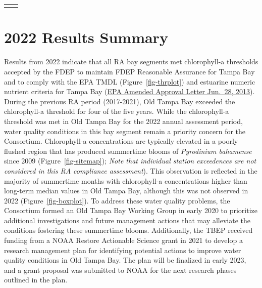 \documentclass[
  letterpaper,
  DIV=11,
  numbers=noendperiod]{scrreprt}
\begin{document}
\begin{table}[H]
\begin{longtable}[l]{|p{1.50in}|p{5.00in}}
}}\textcolor[HTML]{000000}{\fontsize{13}{13}\selectfont{reasonable}}\textcolor[HTML]{000000}{\fontsize{13}{13}\selectfont{\ }}\textcolor[HTML]{000000}{\fontsize{13}{13}\selectfont{assurance}}\textcolor[HTML]{000000}{\fontsize{13}{13}\selectfont{\ }}\textcolor[HTML]{000000}{\fontsize{13}{13}\selectfont{for}}\textcolor[HTML]{000000}{\fontsize{13}{13}\selectfont{\ }}\textcolor[HTML]{000000}{\fontsize{13}{13}\selectfont{bay}}\textcolor[HTML]{000000}{\fontsize{13}{13}\selectfont{\ }}\textcolor[HTML]{000000}{\fontsize{13}{13}\selectfont{segment}}\textcolor[HTML]{000000}{\fontsize{13}{13}\selectfont{\ }}\textcolor[HTML]{000000}{\fontsize{13}{13}\selectfont{allocations.}}} \\





\end{longtable}

\end{table}


\hypertarget{var-maxyr-results-summary}{%
\chapter{2022 Results Summary}\label{var-maxyr-results-summary}}

Results from 2022 indicate that all RA bay segments met chlorophyll-a
thresholds accepted by the FDEP to maintain FDEP Reasonable Assurance
for Tampa Bay and to comply with the EPA TMDL (Figure~\ref{fig-thrplot})
and estuarine numeric nutrient criteria for Tampa Bay
(\href{https://www.epa.gov/sites/default/files/2015-04/documents/florida-amended-determination.pdf}{EPA
Amended Approval Letter Jun.~28, 2013}). During the previous RA period
(2017-2021), Old Tampa Bay exceeded the chlorophyll-a threshold for four
of the five years. While the chlorophyll-a threshold was met in Old
Tampa Bay for the 2022 annual assessment period, water quality
conditions in this bay segment remain a priority concern for the
Consortium. Chlorophyll-a concentrations are typically elevated in a
poorly flushed region that has produced summertime blooms of
\emph{Pyrodinium bahamense} since 2009 (Figure~\ref{fig-sitemap});
\emph{Note that individual station exceedences are not considered in
this RA compliance assessment}). This observation is reflected in the
majority of summertime months with chlorophyll-a concentrations higher
than long-term median values in Old Tampa Bay, although this was not
observed in 2022 (Figure~\ref{fig-boxplot}). To address these water
quality problems, the Consortium formed an Old Tampa Bay Working Group
in early 2020 to prioritize additional investigations and future
management actions that may alleviate the conditions fostering these
summertime blooms. Additionally, the TBEP received funding from a NOAA
Restore Actionable Science grant in 2021 to develop a research
management plan for identifying potential actions to improve water
quality conditions in Old Tampa Bay. The plan will be finalized in early
2023, and a grant proposal was submitted to NOAA for the next research
phases outlined in the plan.
\end{document}
